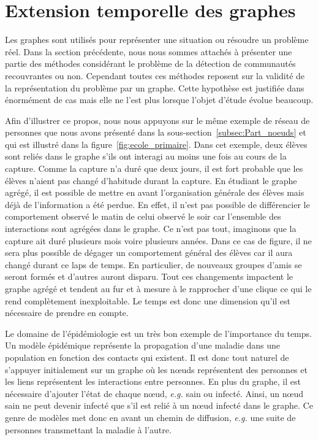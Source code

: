 \section{Extension temporelle des graphes}
\label{sec:intro_extension_temporelle}

Les graphes sont utilisés pour représenter une situation ou résoudre un problème réel.
Dans la section précédente, nous nous sommes attachés à présenter une partie des méthodes considérant le problème de la détection de communautés recouvrantes ou non.
Cependant toutes ces méthodes reposent sur la validité de la représentation du problème par un graphe.
Cette hypothèse est justifiée dans énormément de cas mais elle ne l'est plus lorsque l'objet d'étude évolue beaucoup.

Afin d'illustrer ce propos, nous nous appuyons sur le même exemple de réseau de personnes que nous avons présenté dans la sous-section~\ref{subsec:Part_noeuds} et qui est illustré dans la figure~\ref{fig:ecole_primaire}.
Dans cet exemple, deux élèves sont reliés dans le graphe s'ils ont interagi au moins une fois au cours de la capture.
Comme la capture n'a duré que deux jours, il est fort probable que les élèves n'aient pas changé d'habitude durant la capture.
En étudiant le graphe agrégé, il est possible de mettre en avant l'organisation générale des élèves mais déjà de l'information a été perdue.
En effet, il n'est pas possible de différencier le comportement observé le matin de celui observé le soir car l'ensemble des interactions sont agrégées dans le graphe.
Ce n'est pas tout, imaginons que la capture ait duré plusieurs mois voire plusieurs années.
Dans ce cas de figure, il ne sera plus possible de dégager un comportement général des élèves car il aura changé durant ce laps de temps.
En particulier, de nouveaux groupes d'amis se seront formés et d'autres auront disparu.
Tout ces changements impactent le graphe agrégé et tendent au fur et à mesure à le rapprocher d'une clique ce qui le rend complètement inexploitable.
Le temps est donc une dimension qu'il est nécessaire de prendre en compte.

Le domaine de l'épidémiologie est un très bon exemple de l'importance du temps.
Un modèle épidémique représente la propagation d'une maladie dans une population en fonction des contacts qui existent.
Il est donc tout naturel de s'appuyer initialement sur un graphe où les n\oe{}uds représentent des personnes et les liens représentent les interactions entre personnes.
En plus du graphe, il est nécessaire d'ajouter l'état de chaque n\oe{}ud, \emph{e.g.} sain ou infecté.
Ainsi, un n\oe{}ud sain ne peut devenir infecté que s'il est relié à un n\oe{}ud infecté dans le graphe.
Ce genre de modèles met donc en avant un chemin de diffusion, \emph{e.g.} une suite de personnes transmettant la maladie à l'autre.

